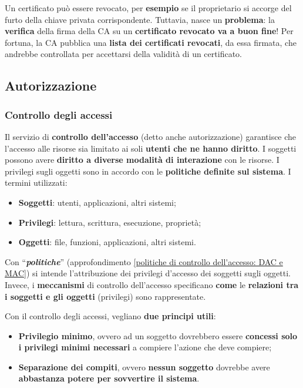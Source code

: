 \documentclass[a4paper]{article}
\newcommand{\dquotes}[1]{``#1''}
\begin{document}
	\noindent
	Un certificato può essere revocato, per \textcolor{Green4}{\textbf{esempio}} se il proprietario si accorge del furto della chiave privata corrispondente. Tuttavia, nasce un \textbf{problema}: la \textbf{verifica} della firma della CA su un \textbf{certificato revocato va a buon fine}! Per fortuna, la CA pubblica una \textbf{lista dei certificati revocati}, da essa firmata, che andrebbe controllata per accettarsi della validità di un certificato.\newpage
	
	\subsection{Autorizzazione}
	
	\subsubsection{Controllo degli accessi}
	
	Il servizio di \textcolor{Red3}{\textbf{controllo dell'accesso}} (detto anche autorizzazione) garantisce che l'accesso alle risorse sia limitato ai soli \textbf{utenti che ne hanno diritto}. I soggetti possono avere \textbf{diritto a diverse modalità di interazione} con le risorse. I privilegi sugli oggetti sono in accordo con le \textbf{politiche definite sul sistema}. I termini utilizzati:
	\begin{itemize}
		\item \textbf{Soggetti}: utenti, applicazioni, altri sistemi;
		
		\item \textbf{Privilegi}: lettura, scrittura, esecuzione, proprietà;
		
		\item \textbf{Oggetti}: file, funzioni, applicazioni, altri sistemi.
	\end{itemize}
	Con \dquotes{\emph{\textbf{politiche}}} (approfondimento \ref{politiche di controllo dell'accesso: DAC e MAC}) si intende l'attribuzione dei privilegi d'accesso dei soggetti sugli oggetti. Invece, i \textbf{meccanismi} di controllo dell'accesso specificano \textbf{come} le \textbf{relazioni tra i soggetti e gli oggetti} (privilegi) sono rappresentate.\newline
	
	\noindent
	Con il controllo degli accessi, vegliano \textbf{due principi utili}:
	\begin{itemize}
		\item \textbf{Privilegio minimo}, ovvero ad un soggetto dovrebbero essere \textbf{concessi solo i privilegi minimi necessari} a compiere l'azione che deve compiere;
		
		\item \textbf{Separazione dei compiti}, ovvero \textbf{nessun soggetto} dovrebbe avere \textbf{abbastanza potere per sovvertire il sistema}.
	\end{itemize}
	
\end{document}
